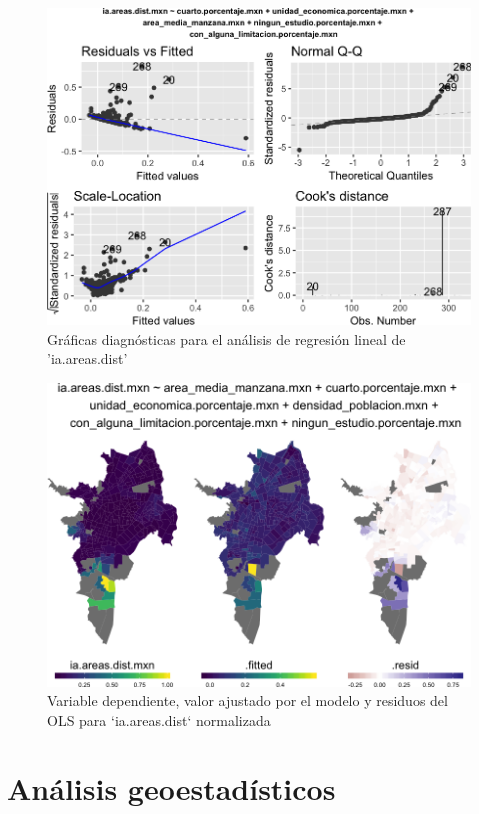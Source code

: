 \documentclass[12pt,]{book}
\begin{document}
\begin{figure}
\includegraphics[width=1\linewidth]{tesis-unigis_files/figure-latex/diagn-lm-areadist-sel-1} \caption{Gráficas diagnósticas para el análisis de regresión lineal de 'ia.areas.dist'}\label{fig:diagn-lm-areadist-sel}
\end{figure}

\begin{figure}
\includegraphics[width=1\linewidth]{tesis-unigis_files/figure-latex/mapas-lm-areasdist-1} \caption{Variable dependiente, valor ajustado por el modelo y residuos del OLS para `ia.areas.dist` normalizada}\label{fig:mapas-lm-areasdist}
\end{figure}

\hypertarget{geostat}{\section{Análisis geoestadísticos}\label{geostat}}
\end{document}
